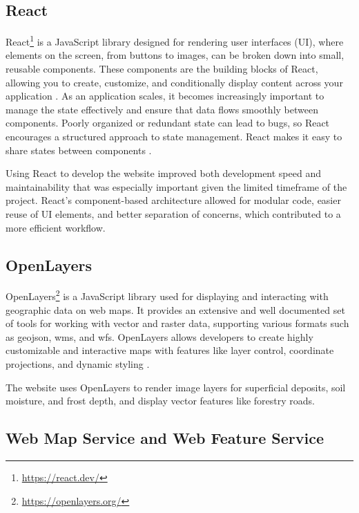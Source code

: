 \subsection{React}\label{subsec:implementation:technologies:react}

React\footnote{\url{https://react.dev/}} is a JavaScript library designed for rendering user interfaces (UI), where elements on the screen, from buttons to images, can be broken down into small, reusable components. These components are the building blocks of React, allowing you to create, customize, and conditionally display content across your application \cite{react_component}. As an application scales, it becomes increasingly important to manage the state effectively and ensure that data flows smoothly between components. Poorly organized or redundant state can lead to bugs, so React encourages a structured approach to state management. React makes it easy to share states between components \cite{react_managing_state}. 

Using React to develop the website improved both development speed and maintainability that was especially important given the limited timeframe of the project. React's component-based architecture allowed for modular code, easier reuse of UI elements, and better separation of concerns, which contributed to a more efficient workflow.

\subsection{OpenLayers}

OpenLayers\footnote{\url{https://openlayers.org/}} is a JavaScript library used for displaying and interacting with geographic data on web maps. It provides an extensive and well documented set of tools for working with vector and raster data, supporting various formats such as \Gls{geojson}, \Gls{wms}, and \Gls{wfs}. OpenLayers allows developers to create highly customizable and interactive maps with features like layer control, coordinate projections, and dynamic styling \cite{openlayers}.

The website uses OpenLayers to render image layers for \gls{superficial deposit}s, soil moisture, and \gls{frost} depth, and display vector features like forestry roads.  

\subsection{Web Map Service and Web Feature Service}

